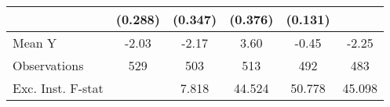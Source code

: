 {\begin{tabular}{l*{5}{c}}
            &     (0.288)         &     (0.347)         &     (0.376)         &     (0.131)         &                     \\
\midrule
Mean Y      &       -2.03         &       -2.17         &        3.60         &       -0.45         &       -2.25         \\
Observations&         529         &         503         &         513         &         492         &         483         \\
Exc. Inst. F-stat&                     &       7.818         &      44.524         &      50.778         &      45.098         \\
\bottomrule
\end{tabular}
}
